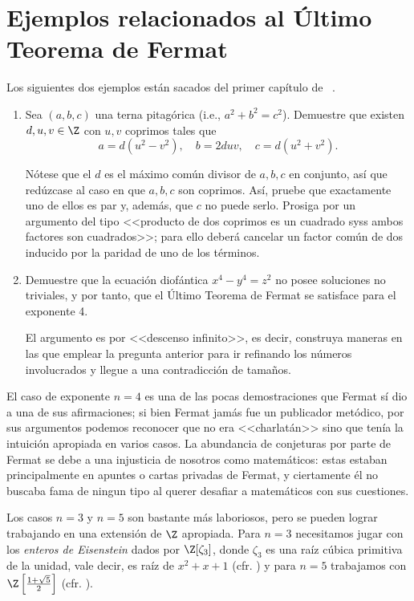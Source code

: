 \documentclass[11pt, reqno]{amsart}
\begin{document}
\section{Ejemplos relacionados al Último Teorema de Fermat}
Los siguientes dos ejemplos están sacados del primer capítulo de \citeauthor{edwards:fermat}~\cite[6-10]{edwards:fermat}.
\begin{enumerate}[resume]
	\item Sea $(a, b, c)$ una terna pitagórica (i.e., $a^2 + b^2 = c^2$).
		Demuestre que existen $d,u,v\in\Z$ con $u, v$ coprimos tales que
		\begin{equation*}
			a = d(u^2 - v^2), \quad b = 2duv, \quad c = d(u^2 + v^2).
		\end{equation*}
		\begin{hint}
			Nótese que el $d$ es el máximo común divisor de $a, b, c$ en conjunto, así que redúzcase al caso en que $a, b, c$ son coprimos.
			Así, pruebe que exactamente uno de ellos es par y, además, que $c$ no puede serlo.
			Prosiga por un argumento del tipo <<producto de dos coprimos es un cuadrado syss ambos factores son cuadrados>>;
			para ello deberá cancelar un factor común de dos inducido por la paridad de uno de los términos.
		\end{hint}

	\item Demuestre que la ecuación diofántica $x^4 - y^4 = z^2$ no posee soluciones no triviales, y por tanto, que el Último Teorema de Fermat se satisface
		para el exponente 4.
		\begin{hint}
			El argumento es por <<descenso infinito>>, es decir, construya maneras en las que emplear la pregunta
			anterior para ir refinando los números involucrados y llegue a una contradicción de tamaños.
		\end{hint}
\end{enumerate}
El caso de exponente $n = 4$ es una de las pocas demostraciones que Fermat sí dio a una de sus afirmaciones; si bien Fermat jamás fue un publicador metódico,
por sus argumentos podemos reconocer que no era <<charlatán>> sino que tenía la intuición apropiada en varios casos.
La abundancia de conjeturas por parte de Fermat se debe a una injusticia de nosotros como matemáticos: estas estaban principalmente en apuntes o cartas privadas
de Fermat, y ciertamente él no buscaba fama de ningun tipo al querer desafiar a matemáticos con sus cuestiones.

Los casos $n = 3$ y $n = 5$ son bastante más laboriosos, pero se pueden lograr trabajando en una extensión de $\Z$ apropiada.
Para $n = 3$ necesitamos jugar con los \textit{enteros de Eisenstein} dados por $\Z[\zeta_3]$, donde $\zeta_3$ es una raíz cúbica primitiva de la unidad,
vale decir, es raíz de $x^2 + x + 1$ (cfr. \cite[40-42, 52-54]{edwards:fermat})
y para $n = 5$ trabajamos con $\Z\left[ \frac{1 + \sqrt{5}}{2} \right]$ (cfr. \cite[65-73]{edwards:fermat}).
\end{document}
